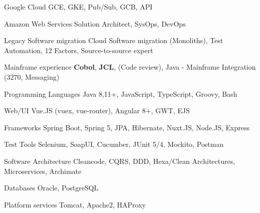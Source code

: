 
\begin{cvskills}

  \cvskill
  {Google Cloud} %
  {GCE, GKE, Pub/Sub, GCB, API} %
  
  \cvskill
  {Amazon Web Services} %
  {Solution Architect, SysOps, DevOps} %
  
\end{cvskills}

\begin{cvskills}
  
  \cvskill
  {Legacy Software migration} %
  {Cloud Software migration (Monoliths), Test Automation, 12 Factors, Source-to-source expert} %
  
  \cvskill
  {Mainframe experience} %
  {\textbf{Cobol}, \textbf{JCL}, (Code review), Java - Mainframe Integration (3270, Messaging)} %

\end{cvskills}


\begin{cvskills}

\cvskill
{Programming Languages} %
{Java 8,11+, JavaScript, TypeScript, Groovy, Bash} %

\cvskill
{Web/UI} %
{Vue.JS (vuex, vue-router), Angular 8+, GWT, EJS} %

\cvskill
{Frameworks} %
{Spring Boot, Spring 5, JPA, Hibernate, Nuxt.JS, Node.JS, Express} %

\cvskill
{Test Tools} %
{Selenium, SoapUI, Cucumber, JUnit 5/4, Mockito, Postman} %

\cvskill
{Software Architecture} %
{Cleancode, CQRS, DDD, Hexa/Clean Architectures, Microservices, Archimate} %

\cvskill
{Databases} %
{Oracle, PostgreSQL} %


\cvskill
{Platform services} %
{Tomcat, Apache2, HAProxy} %

\end{cvskills}



